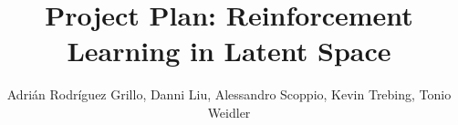 \documentclass[11pt]{article}
\title{Project Plan: Reinforcement Learning in Latent Space}
\author{Adrián Rodríguez Grillo, Danni Liu, Alessandro Scoppio, Kevin Trebing, Tonio Weidler}
\begin{document}
\maketitle








{\tiny\printbibliography}

\clearpage
\raggedbottom
\appendix
\begin{appendix}
\end{appendix}
\end{document}
